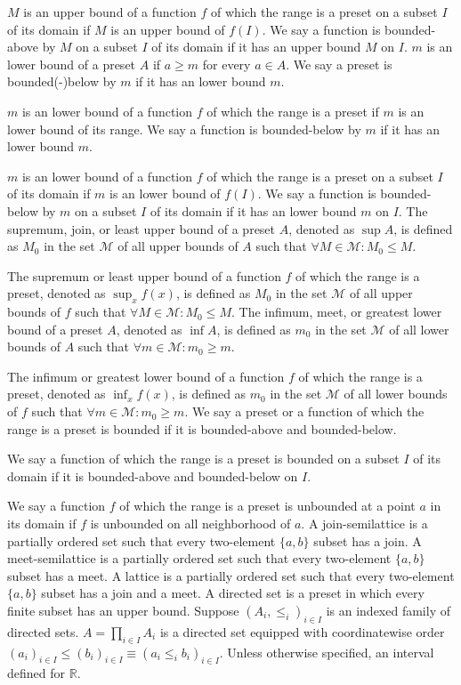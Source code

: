 \documentclass[a4paper,12pt]{article}
\begin{document}
$M$ is an upper bound of a function $f$ of which the range is a preset on a subset $I$ of its domain if $M$ is an upper bound of $f(I)$. We say a function is bounded-above by $M$ on a subset $I$ of its domain if it has an upper bound $M$ on $I$.
$m$ is an lower bound of a preset $A$ if $a\geq m$ for every $a\in A$. We say a preset is bounded(-)below by $m$ if it has an lower bound $m$.

$m$ is an lower bound of a function $f$ of which the range is a preset if $m$ is an lower bound of its range. We say a function is bounded-below by $m$ if it has an lower bound $m$.

$m$ is an lower bound of a function $f$ of which the range is a preset on a subset $I$ of its domain if $m$ is an lower bound of $f(I)$. We say a function is bounded-below by $m$ on a subset $I$ of its domain if it has an lower bound $m$ on $I$.
The supremum, join, or least upper bound of a preset $A$, denoted as $\sup A$, is defined as $M_0$ in the set $\mathcal{M}$ of all upper bounds of $A$ such that $\forall M\in\mathcal{M}\colon M_0\leq M$.

The supremum or least upper bound of a function $f$ of which the range is a preset, denoted as $\sup_xf(x)$, is defined as $M_0$ in the set $\mathcal{M}$ of all upper bounds of $f$ such that $\forall M\in\mathcal{M}\colon M_0\leq M$.
The infimum, meet, or greatest lower bound of a preset $A$, denoted as $\inf A$, is defined as $m_0$ in the set $\mathcal{M}$ of all lower bounds of $A$ such that $\forall m\in\mathcal{M}\colon m_0\geq m$.

The infimum or greatest lower bound of a function $f$ of which the range is a preset, denoted as $\inf_xf(x)$, is defined as $m_0$ in the set $\mathcal{M}$ of all lower bounds of $f$ such that $\forall m\in\mathcal{M}\colon m_0\geq m$.
We say a preset or a function of which the range is a preset is bounded if it is bounded-above and bounded-below.

We say a function of which the range is a preset is bounded on a subset $I$ of its domain if it is bounded-above and bounded-below on $I$.

We say a function $f$ of which the range is a preset is unbounded at a point $a$ in its domain if $f$ is unbounded on all neighborhood of $a$.
A join-semilattice is a partially ordered set such that every two-element $\{a,b\}$ subset has a join.
A meet-semilattice is a partially ordered set such that every two-element $\{a,b\}$ subset has a meet.
A lattice is a partially ordered set such that every two-element $\{a,b\}$ subset has a join and a meet.
A directed set is a preset in which every finite subset has an upper bound.
Suppose $(A_i,\le_i)_{i\in I}$ is an indexed family of directed sets. $A=\prod_{i\in I}A_i$ is a directed set equipped with coordinatewise order $(a_i)_{i\in I}\le (b_i)_{i\in I}\equiv(a_i\le_ib_i)_{i\in I}$.
Unless otherwise specified, an interval defined for $\mathbb{R}$.
\end{document}
